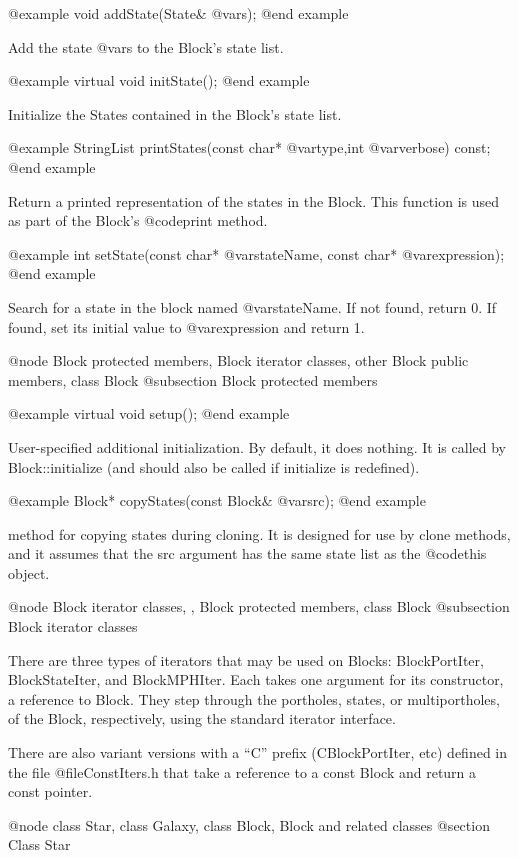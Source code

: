 @example
void addState(State& @var{s});
@end example

Add the state @var{s} to the Block's state list.

@example
virtual void initState();
@end example

Initialize the States contained in the Block's state list.

@example
StringList printStates(const char* @var{type},int @var{verbose}) const;
@end example

Return a printed representation of the states in the Block.  This
function is used as part of the Block's @code{print} method.

@example
int setState(const char* @var{stateName}, const char* @var{expression});
@end example

Search for a state in the block named @var{stateName}.  If not found,
return 0.  If found, set its initial value to @var{expression} and
return 1.

@node Block protected members, Block iterator classes, other Block public members, class Block
@subsection Block protected members

@example
virtual void setup();
@end example

User-specified additional initialization.  By default, it does nothing.
It is called by Block::initialize (and should also be called if
initialize is redefined).

@example
Block* copyStates(const Block& @var{src});
@end example

method for copying states during cloning.  It is designed for use
by clone methods, and it assumes that the src argument has the same
state list as the @code{this} object.

@node Block iterator classes,  , Block protected members, class Block
@subsection Block iterator classes

There are three types of iterators that may be used on Blocks:
BlockPortIter, BlockStateIter, and BlockMPHIter.
Each takes one argument for its constructor, a reference to Block.
They step through the portholes, states, or multiportholes, of the
Block, respectively, using the standard iterator interface.

There are also variant versions with a ``C'' prefix (CBlockPortIter, etc)
defined in the file @file{ConstIters.h} that take a reference to a const Block
and return a const pointer.

@node class Star, class Galaxy, class Block, Block and related classes
@section Class Star

